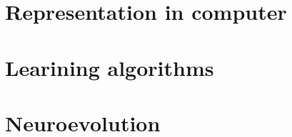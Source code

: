 \FloatBarrier
\section{Representation in computer}

\FloatBarrier
\section{Learining algorithms}

\FloatBarrier
\section{Neuroevolution}
